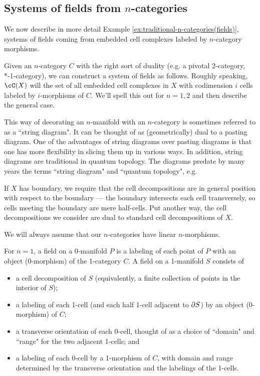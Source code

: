 \subsection{Systems of fields from \texorpdfstring{$n$}{n}-categories}
\label{sec:example:traditional-n-categories(fields)}
We now describe in more detail Example \ref{ex:traditional-n-categories(fields)}, 
systems of fields coming from embedded cell complexes labeled
by $n$-category morphisms.

Given an $n$-category $C$ with the right sort of duality
(e.g. a pivotal 2-category, *-1-category),
we can construct a system of fields as follows.
Roughly speaking, $\cC(X)$ will the set of all embedded cell complexes in $X$
with codimension $i$ cells labeled by $i$-morphisms of $C$.
We'll spell this out for $n=1,2$ and then describe the general case.

This way of decorating an $n$-manifold with an $n$-category is sometimes referred to
as a ``string diagram".
It can be thought of as (geometrically) dual to a pasting diagram.
One of the advantages of string diagrams over pasting diagrams is that one has more
flexibility in slicing them up in various ways.
In addition, string diagrams are traditional in quantum topology.
The diagrams predate by many years the terms ``string diagram" and 
``quantum topology", e.g. \cite{MR0281657,MR776784} %

If $X$ has boundary, we require that the cell decompositions are in general
position with respect to the boundary --- the boundary intersects each cell
transversely, so cells meeting the boundary are mere half-cells.
Put another way, the cell decompositions we consider are dual to standard cell
decompositions of $X$.

We will always assume that our $n$-categories have linear $n$-morphisms.

For $n=1$, a field on a 0-manifold $P$ is a labeling of each point of $P$ with
an object (0-morphism) of the 1-category $C$.
A field on a 1-manifold $S$ consists of
\begin{itemize}
    \item a cell decomposition of $S$ (equivalently, a finite collection
of points in the interior of $S$);
    \item a labeling of each 1-cell (and each half 1-cell adjacent to $\partial S$)
by an object (0-morphism) of $C$;
    \item a transverse orientation of each 0-cell, thought of as a choice of
``domain" and ``range" for the two adjacent 1-cells; and
    \item a labeling of each 0-cell by a 1-morphism of $C$, with
domain and range determined by the transverse orientation and the labelings of the 1-cells.
\end{itemize}

